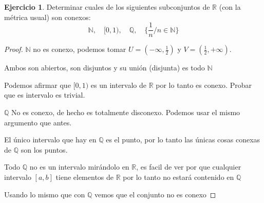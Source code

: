 \documentclass[11pt]{report}
\newcommand{\Q}{\mathbb{Q}}
\newcommand{\R}{\mathbb{R}}
\newcommand{\N}{\mathbb{N}}
\theoremstyle{definition}
\newtheorem{ej}{Ejercicio}
\begin{document}
\begin{ej}
	Determinar cuales de los siguientes subconjuntos de $\R$ (con la métrica usual) son conexos:
	$$ \N , \quad [0,1),\quad  \Q, \quad \bigg\{ \frac{1}{n} / n\in\N \bigg\}$$
		
\begin{proof}
	$\N$ no es conexo, podemos tomar $U = (-\infty , \frac{1}{2})$ y $V=(\frac{1}{2},+\infty)$.

	Ambos son abiertos, son disjuntos y su unión (disjunta) es todo $\N$ 

	Podemos afirmar que $[0,1)$ es un intervalo de $\R$ por lo tanto es conexo. Probar que es intervalo es trivial.

	$\Q$ No es conexo, de hecho es totalmente disconexo. Podemos usar el mismo argumento que antes.

	El único intervalo que hay en $\Q$ es el punto, por lo tanto las únicas cosas conexas de $\Q$ son los puntos.

	Todo $\Q$ no es un intervalo mirándolo en $\R$, es facil de ver por que cualquier intervalo $[a,b]$ tiene elementos de $\R$ por lo tanto no estará contenido en $\Q$ 

	Usando lo mismo que con $\Q$ vemos que el conjunto no es conexo

\end{proof}
\end{ej}
\end{document}
